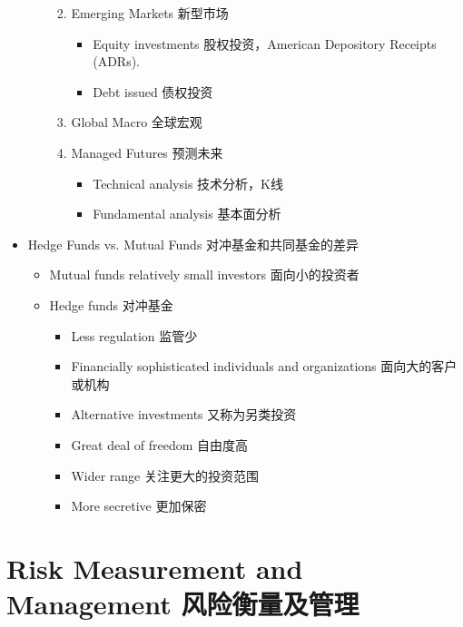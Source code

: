 \documentclass[a4paper,6pt,twoside,openany]{article}
\begin{document}
\begin{itemize}
\begin{itemize}
\begin{enumerate}
\begin{itemize}
      \end{itemize}
    \item Emerging Markets 新型市场
      \begin{itemize}
      \item Equity investments 股权投资，American Depository Receipts (ADRs).
      \item Debt issued 债权投资
      \end{itemize}
    \item Global Macro 全球宏观
    \item Managed Futures 预测未来
      \begin{itemize}
      \item Technical analysis 技术分析，K线
      \item Fundamental analysis 基本面分析
      \end{itemize}
    \end{enumerate}
  \end{itemize}
\item Hedge Funds vs. Mutual Funds 对冲基金和共同基金的差异
  \begin{itemize}
  \item Mutual funds relatively small investors 面向小的投资者
  \item Hedge funds 对冲基金
    \begin{itemize}
    \item Less regulation 监管少
    \item Financially sophisticated individuals and organizations 面向大的客户或机构
    \item Alternative investments 又称为另类投资
    \item Great deal of freedom 自由度高
    \item Wider range 关注更大的投资范围
    \item More secretive 更加保密
    \end{itemize}
  \end{itemize}
\end{itemize}


\newpage

\section{Risk Measurement and Management 风险衡量及管理}
\end{document}
